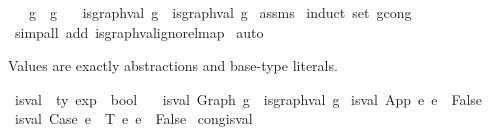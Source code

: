 \begin{isabellebody}
\ \ \ {\isachardoublequoteopen}g{}\ {\isasymsimeq}\ g{}{\isachardoublequoteclose}\isanewline
\ \ \ {\isachardoublequoteopen}is{\isacharunderscore}{\kern0pt}graph{\isacharunderscore}{\kern0pt}val\ g{}\ {\isacharequal}{\kern0pt}\ is{\isacharunderscore}{\kern0pt}graph{\isacharunderscore}{\kern0pt}val\ g{}{\isachardoublequoteclose}\isanewline
%
\isadelimproof
%
\endisadelimproof
%
\isatagproof
{}\isamarkupfalse%
\ assms\isanewline
{}\isamarkupfalse%
\ {\isacharparenleft}{\kern0pt}induct\ set{\isacharcolon}{\kern0pt}\ gcong{\isacharparenright}{\kern0pt}\isanewline
{}\isamarkupfalse%
\ {\isacharparenleft}{\kern0pt}simp{\isacharunderscore}{\kern0pt}all\ add{\isacharcolon}{\kern0pt}\ is{\isacharunderscore}{\kern0pt}graph{\isacharunderscore}{\kern0pt}val{\isacharunderscore}{\kern0pt}ignore{\isacharunderscore}{\kern0pt}lmap{\isacharparenright}{\kern0pt}\isanewline
{}\isamarkupfalse%
\ auto%
\endisatagproof
{\isafoldproof}%
%
\isadelimproof
%
\endisadelimproof
%
\begin{isamarkuptext}%
Values are exactly abstractions and base-type literals.%
\end{isamarkuptext}\isamarkuptrue%
\isamarkupfalse%
\ is{\isacharunderscore}{\kern0pt}val\ {\isacharcolon}{\kern0pt}{\isacharcolon}{\kern0pt}\ {\isachardoublequoteopen}{\isacharprime}{\kern0pt}ty\ exp\ {\isacharequal}{\kern0pt}{\isachargreater}{\kern0pt}\ bool{\isachardoublequoteclose}\ \isanewline
\ \ {\isachardoublequoteopen}is{\isacharunderscore}{\kern0pt}val\ {\isacharparenleft}{\kern0pt}Graph\ g{\isacharparenright}{\kern0pt}\ {\isacharequal}{\kern0pt}\ is{\isacharunderscore}{\kern0pt}graph{\isacharunderscore}{\kern0pt}val\ g{\isachardoublequoteclose}\isanewline
{\isacharbar}{\kern0pt}\ {\isachardoublequoteopen}is{\isacharunderscore}{\kern0pt}val\ {\isacharparenleft}{\kern0pt}App\ e{}\ e{}{\isacharparenright}{\kern0pt}\ {\isacharequal}{\kern0pt}\ False{\isachardoublequoteclose}\isanewline
{\isacharbar}{\kern0pt}\ {\isachardoublequoteopen}is{\isacharunderscore}{\kern0pt}val\ {\isacharparenleft}{\kern0pt}Case\ e{}\ {\isasymGamma}\ T\ e{}\ e{}{\isacharparenright}{\kern0pt}\ {\isacharequal}{\kern0pt}\ False{\isachardoublequoteclose}\isanewline
\isanewline
\isanewline
{}\isamarkupfalse%
\ cong{\isacharunderscore}{\kern0pt}is{\isacharunderscore}{\kern0pt}val{\isacharcolon}{\kern0pt}\isanewline

\end{isabellebody}
